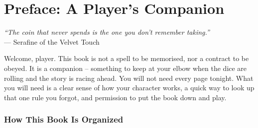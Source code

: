 \chapter*{Preface: A Player's Companion}


\textit{``The coin that never spends is the one you don't remember taking.''} \\
--- Serafine of the Velvet Touch

Welcome, player. This book is not a spell to be memorised, nor a contract to be obeyed. It is a companion -- something to keep at your elbow when the dice are rolling and the story is racing ahead. You will not need every page tonight. What you will need is a clear sense of how your character works, a quick way to look up that one rule you forgot, and permission to put the book down and play.

\subsection*{How This Book Is Organized}

